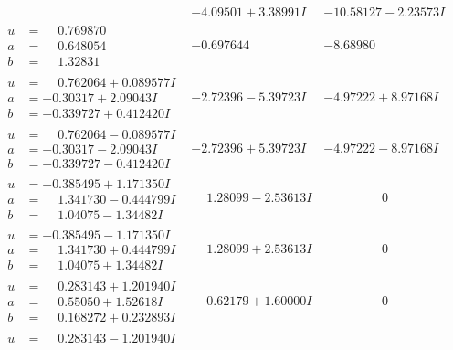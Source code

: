 \documentclass[1p]{elsarticle_modified}
\theoremstyle{definition}
\begin{document}
$$\begin{array}{c|c|c}
 & -4.09501 + 3.38991 I & -10.58127 - 2.23573 I \\ \hline\begin{aligned}
u &= \phantom{-}0.769870\phantom{ +0.000000I} \\
a &= \phantom{-}0.648054\phantom{ +0.000000I} \\
b &= \phantom{-}1.32831\phantom{ +0.000000I}\end{aligned}
 & -0.697644\phantom{ +0.000000I} & -8.68980\phantom{ +0.000000I} \\ \hline\begin{aligned}
u &= \phantom{-}0.762064 + 0.089577 I \\
a &= -0.30317 + 2.09043 I \\
b &= -0.339727 + 0.412420 I\end{aligned}
 & -2.72396 - 5.39723 I & -4.97222 + 8.97168 I \\ \hline\begin{aligned}
u &= \phantom{-}0.762064 - 0.089577 I \\
a &= -0.30317 - 2.09043 I \\
b &= -0.339727 - 0.412420 I\end{aligned}
 & -2.72396 + 5.39723 I & -4.97222 - 8.97168 I \\ \hline\begin{aligned}
u &= -0.385495 + 1.171350 I \\
a &= \phantom{-}1.341730 - 0.444799 I \\
b &= \phantom{-}1.04075 - 1.34482 I\end{aligned}
 & \phantom{-}1.28099 - 2.53613 I & \phantom{-0.000000 } 0 \\ \hline\begin{aligned}
u &= -0.385495 - 1.171350 I \\
a &= \phantom{-}1.341730 + 0.444799 I \\
b &= \phantom{-}1.04075 + 1.34482 I\end{aligned}
 & \phantom{-}1.28099 + 2.53613 I & \phantom{-0.000000 } 0 \\ \hline\begin{aligned}
u &= \phantom{-}0.283143 + 1.201940 I \\
a &= \phantom{-}0.55050 + 1.52618 I \\
b &= \phantom{-}0.168272 + 0.232893 I\end{aligned}
 & \phantom{-}0.62179 + 1.60000 I & \phantom{-0.000000 } 0 \\ \hline\begin{aligned}
u &= \phantom{-}0.283143 - 1.201940 I \\

\end{aligned}
\end{array}$$
\end{document}
